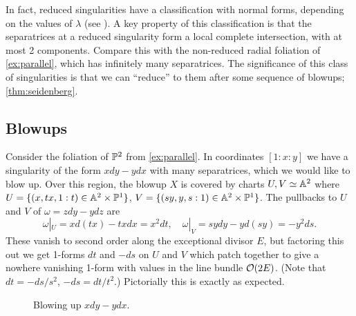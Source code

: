 In fact, reduced singularities have a classification with normal forms,
depending on the values of $\lambda$ (see \cite[\S1]{brunella_book}). A key
property of this classification is that the separatrices at a reduced
singularity form a local complete intersection, with at most 2 components.
Compare this with the non-reduced radial foliation of \cref{ex:parallel}, which
has infinitely many separatrices. The significance of this class of
singularities is that we can ``reduce'' to them after some sequence of blowups;
\cref{thm:seidenberg}.

\subsection{Blowups}

\begin{example}\label{ex:blowup radial}
    Consider the foliation of $\P^2$ from \cref{ex:parallel}. In coordinates
    $[1:x:y]$ we have a singularity of the form $xdy-ydx$ with many
    separatrices, which we would like to blow up. Over this region, the blowup
    $X$ is covered by charts $U,V\simeq\A^2$ where
    $U=\{(x,tx,1:t)\in\A^2\times\P^1\}$, $V=\{(sy,y,s:1)\in\A^2\times\P^1\}$.
    The pullbacks to $U$ and $V$ of $\omega=zdy-ydz$ are
    \begin{equation*}
        \omega|_U = xd(tx)-txdx = x^2dt, \quad
        \omega|_V = sydy - yd(sy) = -y^2ds.
    \end{equation*}
    These vanish to second order along the exceptional divisor $E$, but
    factoring this out we get 1-forms $dt$ and $-ds$ on $U$ and $V$ which patch
    together to give a nowhere vanishing 1-form with values in the line bundle
    $\O(2E)$. (Note that $dt=-ds/s^2$, $-ds=dt/t^2$.) Pictorially this is
    exactly as expected.
    \begin{figure}[H]
        \centering
        \caption{Blowing up $xdy-ydx$.}
    \end{figure}
\end{example}

